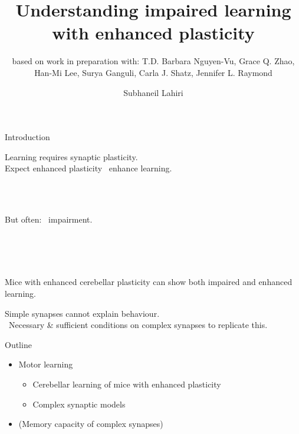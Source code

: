\documentclass{beamer}%
\title[Impaired learning with enhanced plasticity]{Understanding impaired learning with enhanced plasticity}
\subtitle{\small{based on work in preparation with: T.D. Barbara Nguyen-Vu, Grace Q. Zhao, Han-Mi Lee, Surya Ganguli, Carla J. Shatz, Jennifer L. Raymond
}}
\author{Subhaneil Lahiri%
}
\institute[Stanford]{%
Stanford University, Applied Physics
}
\begin{document}

\begin{frame}
%
 \titlepage
%
\end{frame}


\begin{frame}{Introduction}
%
\parbox[t]{0.69\linewidth}{%
 Learning requires synaptic plasticity.\\
 Expect enhanced plasticity \lto\ enhance learning.
}
\parbox[t]{0.29\linewidth}{%
 \hfill{}
}
 \\
 \\
\parbox[t]{0.69\linewidth}{%
 But often: \lto\ impairment.
}
\parbox[t]{0.29\linewidth}{%
 \hfill{}
}
 \\
 \\
 \\

 \vp Mice with enhanced cerebellar plasticity can show both impaired and enhanced learning.

 \vp Simple synapses cannot explain behaviour.\\
 \lto\ Necessary \& sufficient conditions on complex synapses to replicate this.
%
\end{frame}


\begin{frame}{Outline}
%
 \begin{itemize}
   \item Motor learning
 \begin{itemize}
   \vp\item Cerebellar learning of mice with enhanced plasticity

   \vp\item Complex synaptic models
 \end{itemize}
   \vp\item (Memory capacity of complex synapses)
 \end{itemize}
%
\end{frame}
\end{document}
